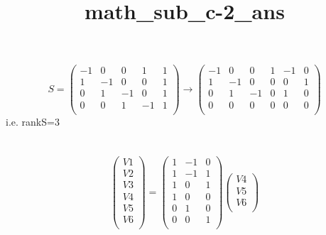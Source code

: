 \documentclass{article}
\title{math_sub_c-2_ans}
\begin{document}
\section{}
\begin{equation}
S=\begin{pmatrix}              
-1&0&0&1&1\\
1&-1&0&0&1\\
0&1&-1&0&1\\
0&0&1&-1&1\\
\end{pmatrix}
\to\begin{pmatrix}
-1&0&0&1&-1&0\\
1&-1&0&0&0&1\\
0&1&-1&0&1&0\\
0&0&0&0&0&0\\
\end{pmatrix}
\end{equation}
i.e. rankS=3
\section{}
\begin{equation}
\begin{pmatrix}
V1\\
V2\\
V3\\
V4\\
V5\\
V6\\
\end{pmatrix}
=\begin{pmatrix}
1&-1&0\\
1&-1&1\\
1&0&1\\
1&0&0\\
0&1&0\\
0&0&1\\
\end{pmatrix}
\begin{pmatrix}
V4\\
V5\\
V6\\
\end{pmatrix}
\end{equation}
\end{document}
